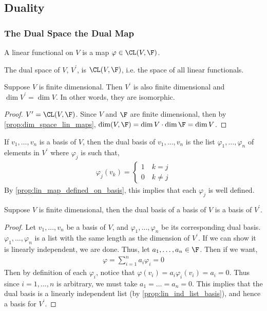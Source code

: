 \documentclass{article}
\begin{document}
\subsection{Duality}
\subsubsection{The Dual Space the Dual Map}
  \begin{defn}
    A linear functional on $V$ is a map $\varphi \in \CL(V, \F)$.
  \end{defn}
  \begin{defn}
    The dual space of $V$, $V^\prime$, is $\CL(V, \F)$, i.e. the space of all linear functionals.
  \end{defn}
  \begin{prop}
    Suppose $V$ is finite dimensional. Then $V^\prime$ is also finite dimensional and $\dim V^\prime = \dim V$. In other words, they are isomorphic.
  \end{prop}
  \begin{proof}
    $V^\prime = \CL(V, \F)$. Since $V$ and $\F$ are finite dimensional, then by \ref{prop:dim_space_lin_maps}, $\dim(V, \F) = \dim V\cdot\dim\F = \dim V$.
  \end{proof}
  \begin{defn}
    If $v_1, \dots, v_n$ is a basis of $V$, then the dual basis of $v_1, \dots, v_n$ is the list $\varphi_1, \dots, \varphi_n$ of elements in $V^\prime$ where $\varphi_j$ is such that,
    \begin{align*}
      \varphi_j(v_k) = 
        \begin{cases}
          1 \quad k = j \\
          0 \quad k \neq j
        \end{cases}
    \end{align*}
    By \ref{prop:lin_map_defined_on_basis}, this implies that each $\varphi_j$ is well defined.
  \end{defn}
  \begin{prop}
    Suppose $V$ is finite dimensional, then the dual basis of a basis of $V$ is a basis of $V^\prime$.
  \end{prop}
  \begin{proof}
    Let $v_1, \dots, v_n$ be a basis of $V$, and $\varphi_1, \dots, \varphi_n$ be its corresponding dual basis. $\varphi_1, \dots, \varphi_n$ is a list with the same length as the dimension
    of $V^\prime$. If we can show it is linearly independent, we are done. Thus, let $a_1, \dots, a_n \in \F$. Then if we want,
    \begin{align*}
      \varphi = \sum_{i = 1}^{n}a_i\varphi_i = 0
    \end{align*}
    Then by definition of each $\varphi_i$, notice that $\varphi(v_i) = a_i\varphi_i(v_i) = a_i = 0$. Thus since $i = 1, \dots, n$ is arbitrary, we must take $a_1 = \dots = a_n = 0$. This
    implies that the dual basis is a linearly independent list (by \eqref{prop:lin_ind_list_basis}), and hence a basis for $V^\prime$.
  \end{proof}
\end{document}
